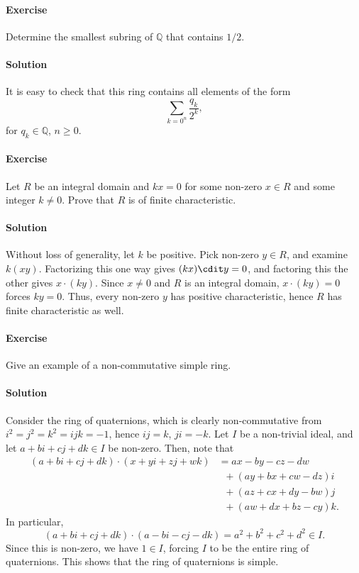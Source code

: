 \documentclass[10pt]{article}
\newcounter{prob}
\newcommand{\problem}{\stepcounter{prob}\paragraph{Exercise \arabic{prob}}}
\newcommand{\solution}{\paragraph{Solution}}
\newcommand{\Q}{\mathbb{Q}}
\begin{document}
    \problem Determine the smallest subring of $\Q$ that contains $1 / 2$.

    \solution It is easy to check that this ring contains all elements of the form \[
        \sum_{k = 0^n} \frac{q_k}{2^k},
    \] for $q_k \in \Q$, $n \geq 0$.


    \problem Let $R$ be an integral domain and $kx = 0$ for some non-zero $x \in R$
    and some integer $k \neq 0$. Prove that $R$ is of finite characteristic.

    \solution Without loss of generality, let $k$ be positive. Pick non-zero $y \in
    R$, and examine $k(xy)$. Factorizing this one way gives $(kx)\cdit y = 0$, and
    factoring this the other gives $x\cdot (ky)$. Since $x \neq 0$ and $R$ is an
    integral domain, $x\cdot (ky) = 0$ forces $ky = 0$. Thus, every non-zero $y$ has
    positive characteristic, hence $R$ has finite characteristic as well.


    \problem Give an example of a non-commutative simple ring.

    \solution Consider the ring of quaternions, which is clearly non-commutative from
    $i^2 = j^2 = k^2 = ijk = -1$, hence $ij = k$, $ji = -k$. Let $I$ be a non-trivial
    ideal, and let $a + bi + cj + dk \in I$ be non-zero. Then, note that
    \begin{align*}
    (a + bi + cj + dk)\cdot(x + yi + zj + wk) &= ax - by - cz - dw \\
        &\;\; + (ay + bx + cw - dz)i \\
        &\;\; + (az + cx + dy - bw)j \\
        &\;\; + (aw + dx + bz - cy)k.
    \end{align*} In particular, \[
        (a + bi + cj + dk)\cdot(a - bi - cj - dk) = a^2 + b^2 + c^2 + d^2 \in I.
    \] Since this is non-zero, we have $1 \in I$, forcing $I$ to be the entire ring
    of quaternions. This shows that the ring of quaternions is simple.
\end{document}
